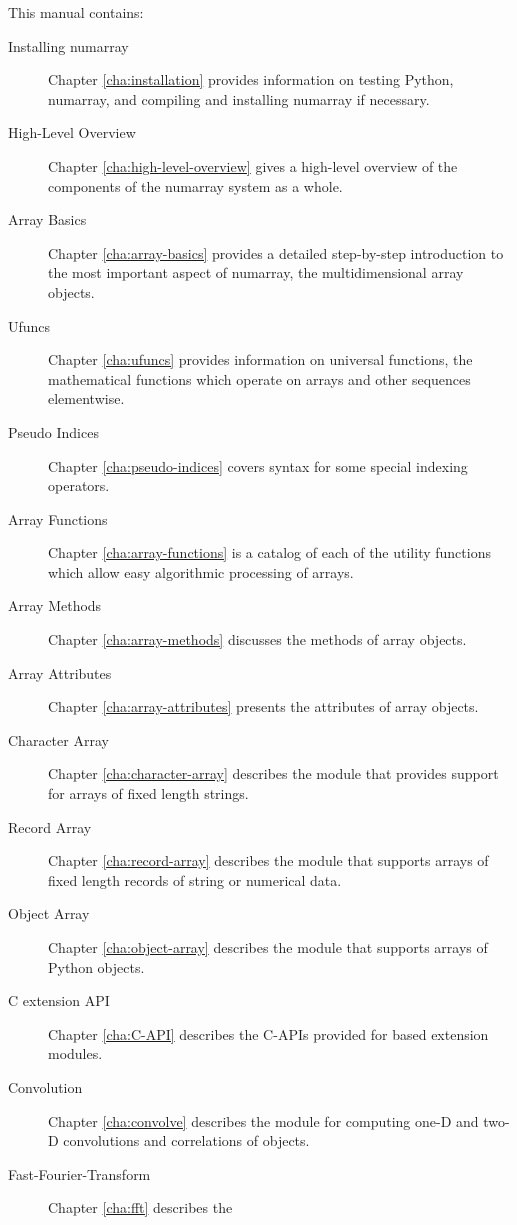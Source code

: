 This manual contains:
\begin{description}
\item[Installing numarray] Chapter \ref{cha:installation} provides information
   on testing Python, numarray, and compiling and installing numarray if
   necessary.
\item[High-Level Overview] Chapter \ref{cha:high-level-overview} gives a
   high-level overview of the components of the numarray system as a whole.
\item[Array Basics] Chapter \ref{cha:array-basics} provides a detailed
   step-by-step introduction to the most important aspect of numarray, the
   multidimensional array objects.
\item[Ufuncs] Chapter \ref{cha:ufuncs} provides information on universal
   functions, the mathematical functions which operate on arrays and other
   sequences elementwise.
\item[Pseudo Indices] Chapter \ref{cha:pseudo-indices} covers syntax for some
   special indexing operators.
\item[Array Functions] Chapter \ref{cha:array-functions} is a catalog of each
   of the utility functions which allow easy algorithmic processing of arrays.
\item[Array Methods] Chapter \ref{cha:array-methods} discusses the methods of
   array objects.
\item[Array Attributes] Chapter \ref{cha:array-attributes} presents the
   attributes of array objects.
\item[Character Array] Chapter \ref{cha:character-array} describes the
   module that provides support for arrays of fixed
  length strings.
\item[Record Array] Chapter \ref{cha:record-array} describes the
    module that supports arrays of fixed length records
   of string or numerical data.
\item[Object Array] Chapter \ref{cha:object-array} describes the
    module that supports arrays of Python objects.
\item[C extension API] Chapter \ref{cha:C-API} describes the C-APIs provided
   for  based extension modules.
\item[Convolution] Chapter \ref{cha:convolve} describes the
    module for computing one-D and two-D convolutions
   and correlations of  objects.
\item[Fast-Fourier-Transform] Chapter \ref{cha:fft} describes the

\end{description}
